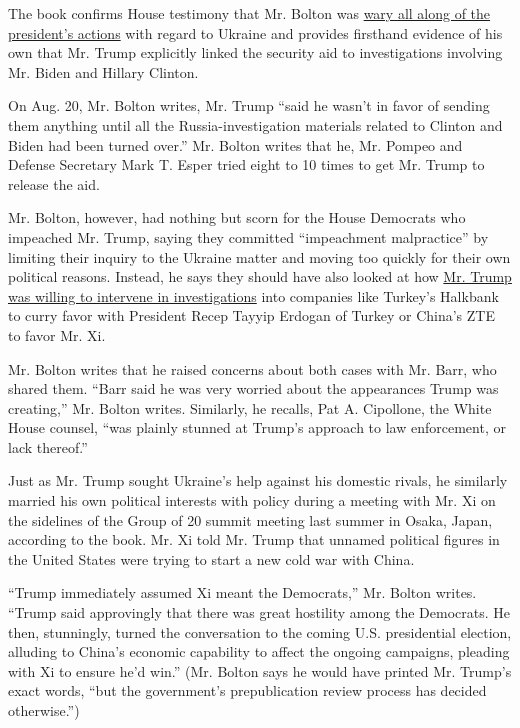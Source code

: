 The book confirms House testimony that Mr. Bolton was
\href{https://www.nytimes3xbfgragh.onion/2019/10/14/us/politics/bolton-giuliani-fiona-hill-testimony.html}{wary
all along of the president's actions} with regard to Ukraine and
provides firsthand evidence of his own that Mr. Trump explicitly linked
the security aid to investigations involving Mr. Biden and Hillary
Clinton.

On Aug. 20, Mr. Bolton writes, Mr. Trump ``said he wasn't in favor of
sending them anything until all the Russia-investigation materials
related to Clinton and Biden had been turned over.'' Mr. Bolton writes
that he, Mr. Pompeo and Defense Secretary Mark T. Esper tried eight to
10 times to get Mr. Trump to release the aid.

Mr. Bolton, however, had nothing but scorn for the House Democrats who
impeached Mr. Trump, saying they committed ``impeachment malpractice''
by limiting their inquiry to the Ukraine matter and moving too quickly
for their own political reasons. Instead, he says they should have also
looked at how
\href{https://www.nytimes3xbfgragh.onion/2020/01/27/us/politics/john-bolton-trump-book-barr.html}{Mr.
Trump was willing to intervene in investigations} into companies like
Turkey's Halkbank to curry favor with President Recep Tayyip Erdogan of
Turkey or China's ZTE to favor Mr. Xi.

Mr. Bolton writes that he raised concerns about both cases with Mr.
Barr, who shared them. ``Barr said he was very worried about the
appearances Trump was creating,'' Mr. Bolton writes. Similarly, he
recalls, Pat A. Cipollone, the White House counsel, ``was plainly
stunned at Trump's approach to law enforcement, or lack thereof.''

Just as Mr. Trump sought Ukraine's help against his domestic rivals, he
similarly married his own political interests with policy during a
meeting with Mr. Xi on the sidelines of the Group of 20 summit meeting
last summer in Osaka, Japan, according to the book. Mr. Xi told Mr.
Trump that unnamed political figures in the United States were trying to
start a new cold war with China.

``Trump immediately assumed Xi meant the Democrats,'' Mr. Bolton writes.
``Trump said approvingly that there was great hostility among the
Democrats. He then, stunningly, turned the conversation to the coming
U.S. presidential election, alluding to China's economic capability to
affect the ongoing campaigns, pleading with Xi to ensure he'd win.''
(Mr. Bolton says he would have printed Mr. Trump's exact words, ``but
the government's prepublication review process has decided otherwise.'')

